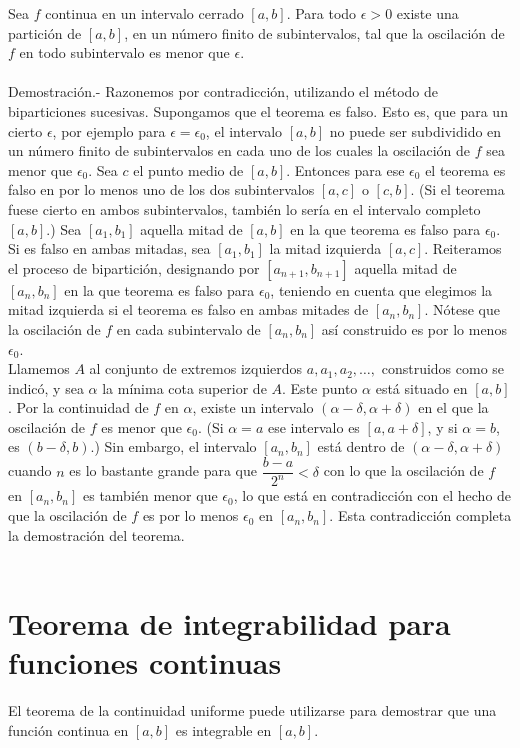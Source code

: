 \begin{teo}
    Sea $f$ continua en un intervalo cerrado $[a,b]$. Para todo $\epsilon>0$ existe una partición de $[a,b]$, en un número finito de subintervalos, tal que la oscilación de $f$ en todo subintervalo es menor que $\epsilon$.\\\\
	Demostración.-\; Razonemos por contradicción, utilizando el método de biparticiones sucesivas. Supongamos que el teorema es falso. Esto es, que para un cierto $\epsilon$, por ejemplo para $\epsilon=\epsilon_0$, el intervalo $[a,b]$ no puede ser subdividido en un número finito de subintervalos en cada uno de los cuales la oscilación de $f$ sea menor que $\epsilon_0$. Sea $c$ el punto medio de $[a,b]$. Entonces para ese $\epsilon_0$ el teorema es falso en por lo menos uno de los dos subintervalos $[a,c]$ o $[c,b]$. (Si el teorema fuese cierto en ambos subintervalos, también lo sería en el intervalo completo $[a,b]$.) Sea $[a_1,b_1]$ aquella mitad de $[a,b]$ en la que teorema es falso para $\epsilon_0$. Si es falso en ambas mitadas, sea $[a_1,b_1]$ la mitad izquierda $[a,c]$. Reiteramos el proceso de bipartición, designando por $[a_{n+1},b_{n+1}]$ aquella mitad de $[a_n,b_n]$ en la que teorema es falso para $\epsilon_0$, teniendo en cuenta que elegimos la mitad izquierda si el teorema es falso en ambas mitades de $[a_n,b_n]$. Nótese que la oscilación de $f$ en cada subintervalo de $[a_n,b_n]$ así construido es por lo menos $\epsilon_0$.\\
	Llamemos $A$ al conjunto de extremos izquierdos $a,a_1,a_2,\ldots,$ construidos como se indicó, y sea $\alpha$ la mínima cota superior de $A$. Este punto $\alpha$ está situado en $[a,b]$. Por la continuidad de $f$ en $\alpha$, existe un intervalo $(\alpha-\delta,\alpha+\delta)$ en el que la oscilación de $f$ es menor que $\epsilon_0$. (Si $\alpha=a$ ese intervalo es $[a,a+\delta]$, y si $\alpha=b$, es $(b-\delta,b)$.) Sin embargo, el intervalo $[a_n,b_n]$ está dentro de $(\alpha-\delta,\alpha+\delta)$ cuando $n$ es lo bastante grande para que $\dfrac{b-a}{2^n}<\delta$ con lo que la oscilación de $f$ en $[a_n,b_n]$ es también menor que $\epsilon_0$, lo que está en contradicción con el hecho de que la oscilación de $f$ es por lo menos $\epsilon_0$ en $[a_n,b_n]$. Esta contradicción completa la demostración del teorema.\\\\
\end{teo}

\section{Teorema de integrabilidad para funciones continuas}
El teorema de la continuidad uniforme puede utilizarse para demostrar que una función continua en $[a,b]$ es integrable en $[a,b]$.\\

